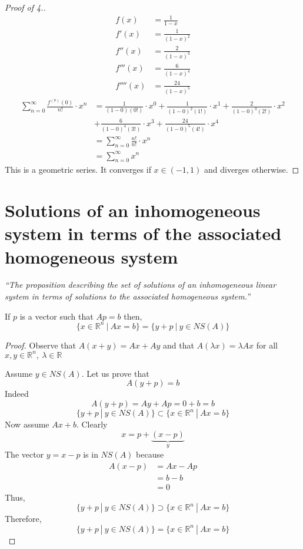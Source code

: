 \documentclass[12pt]{report}
\begin{document}
    \label{Maclaurin series 4}
    \begin{proof}[Proof of \textnormal{4.}]
        \begin{align*}
            f(x) &= \frac{1}{1-x}\\
            f'(x) &= \frac{1}{(1-x)^2}\\
            f''(x) &= \frac{2}{(1-x)^3}\\
            f'''(x) &= \frac{6}{(1-x)^4}\\
            f''''(x) &= \frac{24}{(1-x)^5}
        \end{align*}
        \begin{align*}
            \sum^\infty_{n=0} \frac{f^{(n)}(0)}{n!} \cdot x^n &= \frac{1}{(1-0)(0!)} \cdot x^0 + \frac{1}{(1-0)^2(1!)} \cdot x^1 + \frac{2}{(1-0)^3(2!)} \cdot x^2\\
            &+ \frac{6}{(1-0)^4(3!)} \cdot x^3 + \frac{24}{(1-0)^5(4!)} \cdot x^4\\
            &= \sum^\infty_{n=0} \frac{n!}{n!} \cdot x^n\\
            &= \sum^\infty_{n=0} x^n
        \end{align*}
        This is a geometric series. It converges if \(x \in (-1,1)\) and diverges otherwise.
    \end{proof}
    \setcounter{section}{26}
    \section{Solutions of an inhomogeneous system in terms of the associated homogeneous system}
    \textit{``The proposition describing the set of solutions of an inhomogeneous linear system in terms of solutions to the associated homogeneous system.''} \vspace{3mm}
    \begin{theorem}
        If \(p\) is a vector such that \(Ap = b\) then,
        \[\{x \in \mathbb{R}^n ~|~ Ax = b\} = \{y+p ~|~ y \in NS(A)\}\]
    \end{theorem}
    \begin{proof}
        Observe  that \(A(x+y) = Ax + Ay\) and that \(A(\lambda x) = \lambda Ax\) for all \(x,y \in \mathbb{R}^n, ~ \lambda \in \mathbb{R}\)

        Assume \(y \in NS(A)\). Let us prove that 
        \[A(y+p)= b\]
        Indeed
        \[A(y+p) = Ay + Ap = 0+ b =b\]
        \[\{y+p ~|~ y \in NS(A)\} \subset \{x \in \mathbb{R}^n ~|~ Ax = b\}\]
        Now assume \(Ax + b\). Clearly
        \[x = p + \underbrace{(x-p)}_y\]
        The vector \(y = x-p\) is in \(NS(A)\) because 
        \begin{align*}
            A(x-p) &= Ax -Ap\\
            &= b-b\\
            &= 0
        \end{align*}
        Thus,
        \[\{y+p ~|~ y \in NS(A)\} \supset  \{x \in \mathbb{R}^n ~|~ Ax = b\}\]
        Therefore,
        \[\{y+p ~|~ y \in NS(A)\} = \{x \in \mathbb{R}^n ~|~ Ax = b\}\]
    \end{proof}
\end{document}
